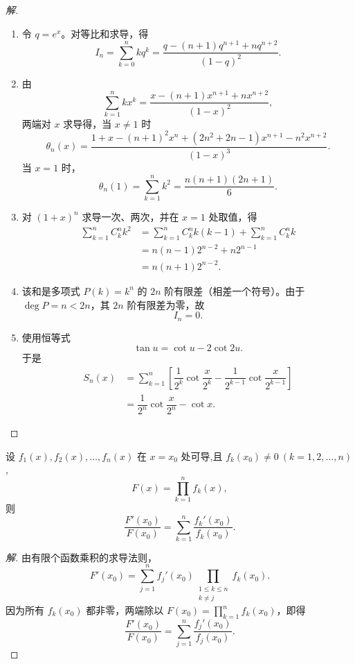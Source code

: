 \documentclass[../../数学分析培优讲义(答案版).tex]{subfiles}
\begin{document}
\begin{proof}[解]
\begin{enumerate}[label=(\arabic*)]
    \item 令 $q=e^x$。对等比和求导，得
    \[
        I_n=\sum\limits_{k=0}^{n}kq^k
        =\dfrac{q-(n+1)q^{n+1}+nq^{n+2}}{(1-q)^2}.
    \]
    \item 由
    \[
        \sum\limits_{k=1}^{n}kx^k
        =\dfrac{x-(n+1)x^{n+1}+nx^{n+2}}{(1-x)^2},
    \]
    两端对 $x$ 求导得，当 $x\neq1$ 时
    \[
        \theta_n(x)=
        \dfrac{1+x-(n+1)^2x^n+(2n^2+2n-1)x^{n+1}-n^2x^{n+2}}
        {(1-x)^3}.
    \]
    当 $x=1$ 时，
    \[
        \theta_n(1)=\sum\limits_{k=1}^{n}k^2
        =\dfrac{n(n+1)(2n+1)}{6}.
    \]
    \item 对 $(1+x)^n$ 求导一次、两次，并在 $x=1$ 处取值，得
    \[
    \begin{aligned}
        \sum\limits_{k=1}^{n}C_k^n k^2
        &=\sum\limits_{k=1}^{n}C_k^n k(k-1)
        +\sum\limits_{k=1}^{n}C_k^n k\\
        &=n(n-1)2^{n-2}+n2^{n-1}\\
        &=n(n+1)2^{n-2}.
    \end{aligned}
    \]
    \item 该和是多项式 $P(k)=k^n$ 的 $2n$ 阶有限差（相差一个符号）。由于 $\deg P=n<2n$，其 $2n$ 阶有限差为零，故
    \[
        I_n=0.
    \]
    \item 使用恒等式
    \[
        \tan u=\cot u-2\cot2u.
    \]
    于是
    \[
    \begin{aligned}
        S_n(x)
        &=\sum\limits_{k=1}^{n}\left[
        \dfrac{1}{2^k}\cot\dfrac{x}{2^k}
        -\dfrac{1}{2^{k-1}}\cot\dfrac{x}{2^{k-1}}
        \right]\\
        &=\dfrac{1}{2^n}\cot\dfrac{x}{2^n}-\cot x.
    \end{aligned}
    \]
\end{enumerate}
\end{proof}

\begin{example}
设 $f_1(x),f_2(x),\ldots,f_n(x)$ 在 $x=x_0$ 处可导,且 $f_k(x_0)\neq0\ (k=1,2,\ldots,n)$,
\[
    F(x)=\prod\limits_{k=1}^n f_k(x),
\]
则
\[
    \dfrac{F'(x_0)}{F(x_0)}
    =\sum\limits_{k=1}^n\dfrac{f_k'(x_0)}{f_k(x_0)}.
\]
\end{example}

\begin{proof}[解]
由有限个函数乘积的求导法则，
\[
    F'(x_0)=\sum\limits_{j=1}^{n}f_j'(x_0)
    \prod\limits_{\substack{1\leq k\leq n\\k\neq j}}f_k(x_0).
\]
因为所有 $f_k(x_0)$ 都非零，两端除以
$F(x_0)=\displaystyle\prod\limits_{k=1}^{n}f_k(x_0)$，即得
\[
    \dfrac{F'(x_0)}{F(x_0)}
    =\sum\limits_{j=1}^{n}\dfrac{f_j'(x_0)}{f_j(x_0)}.
\]
\end{proof}
\end{document}
